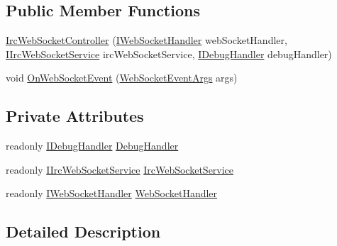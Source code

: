 \subsection*{Public Member Functions}
\begin{DoxyCompactItemize}
\item 
\mbox{\hyperlink{class_little_weeb_library_1_1_controllers_1_1_irc_web_socket_controller_a6668898a19272a602ab6ae79a29caaaa}{Irc\+Web\+Socket\+Controller}} (\mbox{\hyperlink{interface_little_weeb_library_1_1_handlers_1_1_i_web_socket_handler}{I\+Web\+Socket\+Handler}} web\+Socket\+Handler, \mbox{\hyperlink{interface_little_weeb_library_1_1_services_1_1_i_irc_web_socket_service}{I\+Irc\+Web\+Socket\+Service}} irc\+Web\+Socket\+Service, \mbox{\hyperlink{interface_little_weeb_library_1_1_handlers_1_1_i_debug_handler}{I\+Debug\+Handler}} debug\+Handler)
\item 
void \mbox{\hyperlink{class_little_weeb_library_1_1_controllers_1_1_irc_web_socket_controller_a5ea966dddf1e0a082dd5ec28f6ace3ab}{On\+Web\+Socket\+Event}} (\mbox{\hyperlink{class_little_weeb_library_1_1_event_arguments_1_1_web_socket_event_args}{Web\+Socket\+Event\+Args}} args)
\end{DoxyCompactItemize}
\subsection*{Private Attributes}
\begin{DoxyCompactItemize}
\item 
readonly \mbox{\hyperlink{interface_little_weeb_library_1_1_handlers_1_1_i_debug_handler}{I\+Debug\+Handler}} \mbox{\hyperlink{class_little_weeb_library_1_1_controllers_1_1_irc_web_socket_controller_ac7ae7d3e2272f43e33217f61d322e21e}{Debug\+Handler}}
\item 
readonly \mbox{\hyperlink{interface_little_weeb_library_1_1_services_1_1_i_irc_web_socket_service}{I\+Irc\+Web\+Socket\+Service}} \mbox{\hyperlink{class_little_weeb_library_1_1_controllers_1_1_irc_web_socket_controller_a941b64ee037b2e8cdab92dbb0d327a93}{Irc\+Web\+Socket\+Service}}
\item 
readonly \mbox{\hyperlink{interface_little_weeb_library_1_1_handlers_1_1_i_web_socket_handler}{I\+Web\+Socket\+Handler}} \mbox{\hyperlink{class_little_weeb_library_1_1_controllers_1_1_irc_web_socket_controller_ae030b949a8326b776837fc32aec41abb}{Web\+Socket\+Handler}}
\end{DoxyCompactItemize}


\subsection{Detailed Description}


